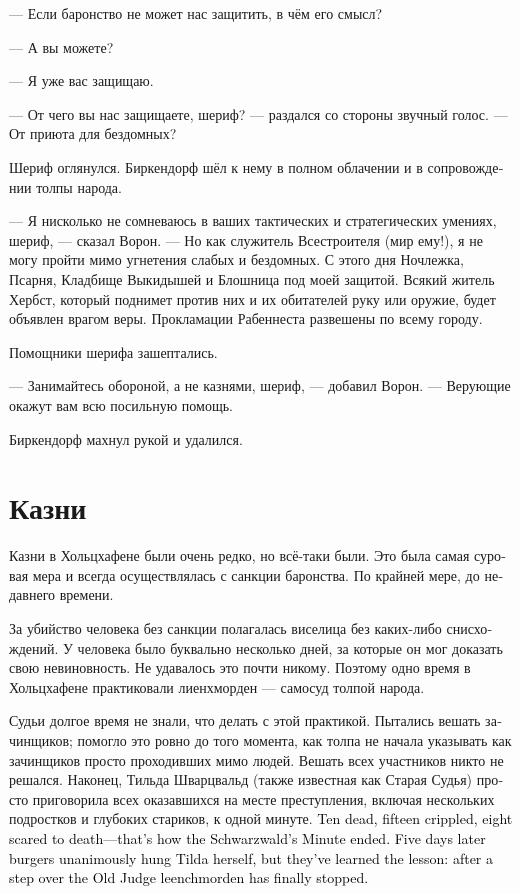 \documentclass[a4paper,12pt,fleqn]{book}\usepackage{cooltooltips}\usepackage{polyglossia}\setdefaultlanguage[babelshorthands=true]{russian}\setotherlanguage{english}\defaultfontfeatures{Ligatures=TeX,Mapping=tex-text} \usepackage{xcolor}\definecolor{lightgray}{HTML}{bbbbbb}\color{lightgray}\newcommand{\ml}[3]{\textenglish{\textcolor{black}{#3}}}
\begin{document}
--- Если баронство не может нас защитить, в чём его смысл?

--- А вы можете?

--- Я уже вас защищаю.

--- От чего вы нас защищаете, шериф? --- раздался со стороны звучный голос.
--- От приюта для бездомных?

Шериф оглянулся.
Биркендорф шёл к нему в полном облачении и в сопровождении толпы народа.

--- Я нисколько не сомневаюсь в ваших тактических и стратегических умениях, шериф, --- сказал Ворон.
--- Но как служитель Всестроителя (мир ему!), я не могу пройти мимо угнетения слабых и бездомных.
С этого дня Ночлежка, Псарня, Кладбище Выкидышей и Блошница под моей защитой.
Всякий житель Хербст, который поднимет против них и их обитателей руку или оружие, будет объявлен врагом веры.
Прокламации Рабеннеста развешены по всему городу.

Помощники шерифа зашептались.

--- Занимайтесь обороной, а не казнями, шериф, --- добавил Ворон.
--- Верующие окажут вам всю посильную помощь.

Биркендорф махнул рукой и удалился.

\section{Казни}

Казни в Хольцхафене были очень редко, но всё-таки были.
Это была самая суровая мера и всегда осуществлялась с санкции баронства.
По крайней мере, до недавнего времени.

За убийство человека без санкции полагалась виселица без каких-либо снисхождений.
У человека было буквально несколько дней, за которые он мог доказать свою невиновность.
Не удавалось это почти никому.
Поэтому одно время в Хольцхафене практиковали лиенхморден --- самосуд толпой народа.

Судьи долгое время не знали, что делать с этой практикой.
Пытались вешать зачинщиков;
помогло это ровно до того момента, как толпа не начала указывать как зачинщиков просто проходивших мимо людей.
Вешать всех участников никто не решался.
Наконец, Тильда Шварцвальд (также известная как Старая Судья) просто приговорила всех оказавшихся на месте преступления, включая нескольких подростков и глубоких стариков, к одной минуте.
\ml{$0$}
{Десять трупов, пятнадцать искалеченных, восемь испуганных до смерти --- таков был результат <<минутования Шварцвальд>>.}
{Ten dead, fifteen crippled, eight scared to death---that's how the Schwarzwald's Minute ended.}
\ml{$0$}
{Спустя пять дней горожане единодушно повесили саму Тильду, но урок усвоили --- на Старой Судье лиенхморден наконец прекратился.}
{Five days later burgers unanimously hung Tilda herself, but they've learned the lesson: after a step over the Old Judge leenchmorden has finally stopped.}
\end{document}
